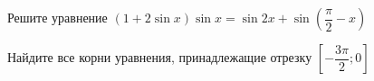 \begin{ex}
	\begin{condition}
		\begin{enumcols}[label=\asbuk*)]
			\item Решите уравнение \( (1+2\sin x)\sin x = \sin 2x + \sin{\left(\dfrac{\pi}{2} - x\right)} \)
			\item Найдите все корни уравнения, принадлежащие отрезку \( \left[-\dfrac{3\pi}{2};0\right] \)
		\end{enumcols}
	\end{condition}
\end{ex}